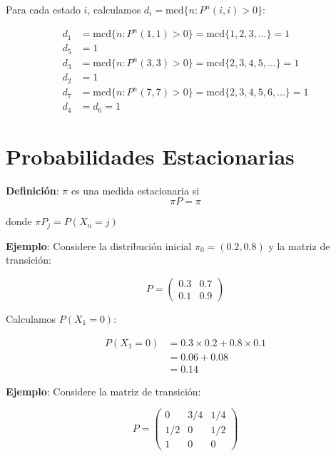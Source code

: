 \documentclass[12pt,a4paper]{article}
\begin{document}
Para cada estado $i$, calculamos $d_i = \text{mcd} \{n: P^n(i,i) > 0\}$:

\begin{align*}
d_1 &= \text{mcd} \{n: P^n(1,1) > 0\} = \text{mcd} \{1, 2, 3, \dots\} = 1 \\
d_5 &= 1 \\
d_3 &= \text{mcd} \{n: P^n(3,3) > 0\} = \text{mcd} \{2, 3, 4, 5, \dots\} = 1 \\
d_2 &= 1 \\
d_7 &= \text{mcd} \{n: P^n(7,7) > 0\} = \text{mcd} \{2, 3, 4, 5, 6, \dots\} = 1 \\
d_4 &= d_6 = 1
\end{align*}

\section*{Probabilidades Estacionarias}

\textbf{Definición}: $\pi$ es una medida estacionaria si
\begin{equation}
\pi P = \pi
\end{equation}

donde $\pi P_j = P(X_n = j)$

\textbf{Ejemplo}: Considere la distribución inicial $\pi_0 = (0.2, 0.8)$ y la matriz de transición:

\begin{equation*}
P = \begin{pmatrix}
0.3 & 0.7 \\
0.1 & 0.9
\end{pmatrix}
\end{equation*}

Calculamos $P(X_1 = 0)$:

\begin{align*}
P(X_1 = 0) &= 0.3 \times 0.2 + 0.8 \times 0.1 \\
&= 0.06 + 0.08 \\
&= 0.14
\end{align*}

\textbf{Ejemplo}: Considere la matriz de transición:

\begin{equation*}
P = \begin{pmatrix}
0 & 3/4 & 1/4 \\
1/2 & 0 & 1/2 \\
1 & 0 & 0
\end{pmatrix}
\end{equation*}
\end{document}
